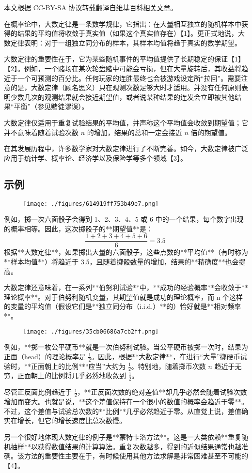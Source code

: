 
本文根据 CC-BY-SA 协议转载翻译自维基百科\href{https://en.wikipedia.org/wiki/Law_of_large_numbers}{相关文章}。

在概率论中，大数定律是一条数学规律，它指出：在大量相互独立的随机样本中获得的结果的平均值将收敛于真实值（如果这个真实值存在）【1】。更正式地说，大数定律表明：对于一组独立同分布的样本，其样本均值将趋于真实的数学期望。

大数定律的重要性在于，它为某些随机事件的平均值提供了长期稳定的保证【1】【2】。例如，一个赌场在某次轮盘赌中可能会亏损，但在大量旋转后，其收益将趋近于一个可预测的百分比。任何玩家的连胜最终也会被游戏设定所“拉回”。需要注意的是，大数定律（顾名思义）只在观测次数足够大时才适用。并没有任何原则表明少数几次的观测结果就会接近期望值，或者说某种结果的连发会立即被其他结果“平衡”（参见赌徒谬误）。

大数定律仅适用于重复试验结果的平均值，并声称这个平均值会收敛到期望值；它并不意味着随着试验次数 $n$ 的增加，结果的总和一定会接近 $n$ 倍的期望值。

在其发展历程中，许多数学家对大数定律进行了不断完善。如今，大数定律被广泛应用于统计学、概率论、经济学以及保险学等多个领域【3】。
\subsection{示例}
\begin{figure}[ht]
\centering
\texttt{[image: ./figures/614919ff753b49e7.png]}
\caption{} \label{fig_DSdl_1}
\end{figure}
例如，掷一次六面骰子会得到 1、2、3、4、5 或 6 中的一个结果，每个数字出现的概率相等。因此，这次掷骰子的**期望值**是：
$$
\frac{1 + 2 + 3 + 4 + 5 + 6}{6} = 3.5~
$$
根据**大数定律**，如果掷出大量的六面骰子，这些点数的**平均值**（有时称为**样本均值**）将趋近于 3.5，且随着掷骰数量的增加，结果的**精确度**也会提高。

大数定律还意味着，在一系列**伯努利试验**中，**成功的经验概率**会收敛于**理论概率**。对于伯努利随机变量，其期望值就是成功的理论概率，而 n 个这样的变量的平均值（假设它们是**独立同分布（i.i.d.）**的）恰好就是**相对频率**。
\begin{figure}[ht]
\centering
\texttt{[image: ./figures/35cb06686a7cb2ff.png]}
\caption{} \label{fig_DSdl_2}
\end{figure}
例如，**掷一枚公平硬币**就是一次伯努利试验。当公平硬币被掷一次时，结果为正面（head）的理论概率是 $\frac{1}{2}$。因此，根据**大数定律**，在进行“大量”掷硬币试验时，**正面朝上的比例**“应当”大约为 $\frac{1}{2}$。特别地，随着掷币次数 $n$ 趋近于无穷，正面朝上的比例将几乎必然地收敛到 $\frac{1}{2}$。

尽管正反面比例趋近于 $\frac{1}{2}$，**正反面次数的绝对差值**却几乎必然会随着试验次数增加而变大。也就是说，**这个差值保持在一个很小的数值的概率会趋近于零**。不过，这个差值与试验总次数的**比例**几乎必然趋近于零。从直觉上说，差值确实在增长，但它的增长速度比总次数慢。

另一个很好地体现大数定律的例子是**蒙特卡洛方法**。这是一大类依赖**重复随机抽样**以获得数值结果的计算算法。重复次数越多，得到的近似结果通常也越准确。该方法的重要性主要在于，有时候使用其他方法求解是非常困难甚至不可能的【4】。
